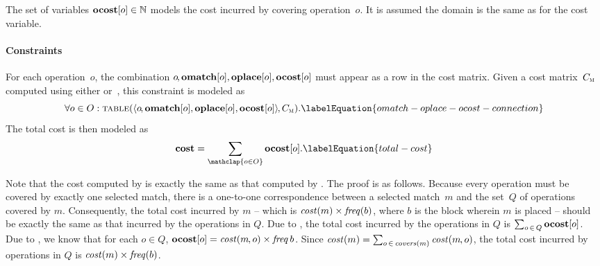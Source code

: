The set of \glspl{variable} \mbox{$\mVar{ocost}[o] \in \mNatNumSet$} models the
cost incurred by covering \gls{operation}~$o$\hspace{-.8pt}.
%
It is assumed the \gls{domain} is the same as for the \gls{cost variable}.


\paragraph{Constraints}

For each \gls{operation}~$o$\hspace{-.8pt}, the combination
\mbox{$o\hspace{-1pt}, \mVar{omatch}[o], \mVar{oplace}[o], \mVar{ocost}[o]$}
must appear as a row in the cost matrix.
%
Given a cost matrix~$C_{\textsc{m}}$ computed using either
 or~, this
\gls{constraint} is modeled as
%
\begin{equation}
  \forall o \in \mOpSet :
  \mTable(
    \mTuple{
      o\hspace{-1pt},
      \mVar{omatch}[o],
      \mVar{oplace}[o],
      \mVar{ocost}[o]
    } \hspace{-1pt},
    \mCostMatrix
  ).
  \labelEquation{omatch-oplace-ocost-connection}
\end{equation}
%
The total cost is then modeled as
%
\begin{equation}
  \mVar{cost} = \sum_{\mathclap{o \in \mOpSet}} \mVar{ocost}[o].
  \labelEquation{total-cost}
\end{equation}

Note that the cost computed by  is exactly the same as
that computed by .
%
The proof is as follows.
%
Because every \gls{operation} must be covered by exactly one selected
\gls{match}, there is a one-to-one correspondence between a selected
\gls{match}~$m$ and the set~$Q$ of \glspl{operation} covered by
$m$\hspace{-.8pt}.
%
Consequently, the total cost incurred by $m$ -- which is \mbox{$\operatorname{\textrm{\textit{cost}}}(m) \times
  \operatorname{\textrm{\textit{freq}}}(b)$}, where $b$ is the \gls{block} wherein $m$ is placed -- should be
exactly the same as that incurred by the \glspl{operation} in $Q$.
%
Due to , the total cost incurred by the
\glspl{operation} in $Q$ is \mbox{$\sum_{o \,\in\, Q} \mVar{ocost}[o]$}.
%
Due to , we
know that for each \mbox{$o \in Q$}, \mbox{$\mVar{ocost}[o] =
  \mCost(m \hspace{-.8pt}, o) \times \mFreq{b}$}.
%
Since \mbox{$\operatorname{\textrm{\textit{cost}}}(m) = \sum_{o \,\in\, \operatorname{\textrm{\textit{covers}}}(m)} \operatorname{\textrm{\textit{cost}}}(m \hspace{-.8pt},
  o)$}, the total cost incurred by \glspl{operation} in $Q$ is \mbox{$\operatorname{\textrm{\textit{cost}}}(m)
  \times \operatorname{\textrm{\textit{freq}}}(b)$}.
%
\hfill\qedsymbol


